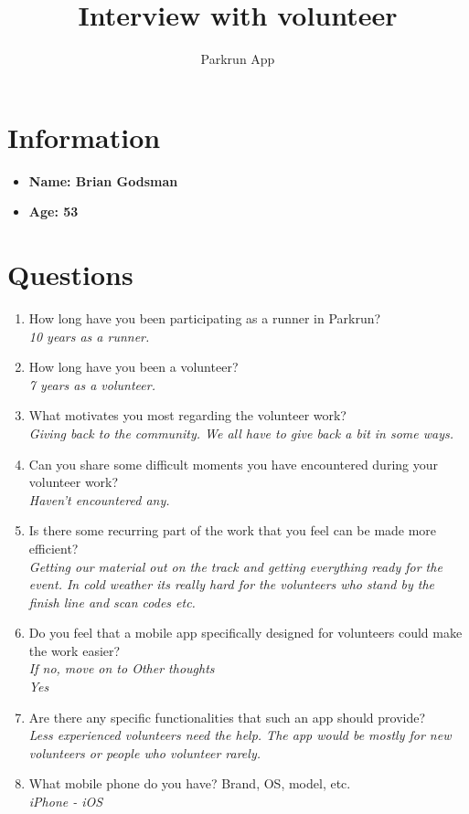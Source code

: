 \documentclass{article}
\title{\textbf{Interview with volunteer}}
\author{Parkrun App}
\date{}
\begin{document}
\maketitle
\thispagestyle{empty}
\section*{Information}
\begin{itemize}[label=]
    \item \textbf{Name: Brian Godsman} 
    \item \textbf{Age: 53} 
\end{itemize}

\section*{Questions}
\begin{enumerate}[label=\textbf{Question \arabic*:}]
    \item How long have you been participating as a runner in Parkrun?\\
        \textit{10 years as a runner.}
    \item How long have you been a volunteer?\\
        \textit{7 years as a volunteer.}
    \item What motivates you most regarding the volunteer work?\\
        \textit{Giving back to the community. We all have to give back a bit in some ways. }
    \item Can you share some difficult moments you have encountered during your volunteer work?\\
        \textit{Haven't encountered any.}
    \item Is there some recurring part of the work that you feel can be made more efficient?\\
        \textit{Getting our material out on the track and getting everything ready for the event. In cold weather its really hard for the volunteers who stand by the finish line and scan codes etc. }
    \item Do you feel that a mobile app specifically designed for volunteers could make the work easier?\\
    \textit{If no, move on to Other thoughts}\\
        \textit{Yes}
    \item Are there any specific functionalities that such an app should provide?\\
        \textit{Less experienced volunteers need the help. The app would be mostly for new volunteers or people who volunteer rarely.}
    \item What mobile phone do you have? Brand, OS, model, etc. \\
        \textit{iPhone - iOS}
\end{enumerate}
\end{document}
